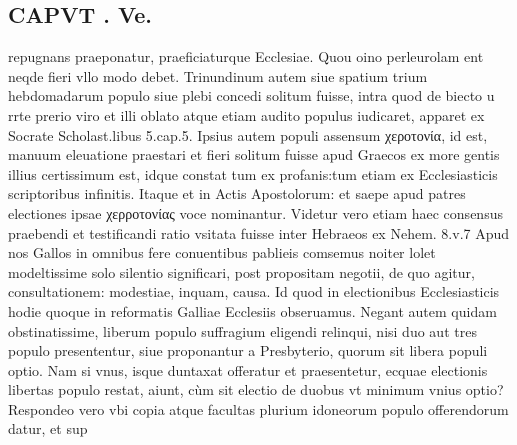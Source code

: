\documentclass{article}
\begin{document}
\begin{pages}
\section*{CAPVT . Ve. }
\marginpar{[ p.355 ]}\pstart repugnans praeponatur, praeficiaturque Ecclesiae. Quou oino perleurolam ent neqde fieri vllo modo debet.  \pend\pstart Trinundinum autem siue spatium trium hebdomadarum populo siue plebi concedi solitum fuisse, intra quod de biecto u rrte prerio viro et illi oblato atque etiam audito populus iudicaret, apparet ex Socrate Scholast.libus  5.cap.5.  \pend\pstart Ipsius autem populi assensum χεροτονία, id est, manuum eleuatione praestari et fieri solitum fuisse apud Graecos ex more gentis illius certissimum est, idque constat tum ex profanis:tum etiam ex Ecclesiasticis scriptoribus infinitis. Itaque  et in Actis Apostolorum: et saepe apud patres electiones ipsae χερροτονίας voce nominantur. Videtur vero etiam haec consensus praebendi et testificandi ratio vsitata fuisse inter Hebraeos ex Nehem. 8.v.7 Apud nos Gallos in omnibus fere conuentibus pablieis comsemus noiter lolet modeltissime solo silentio significari, post propositam negotii, de quo agitur, consultationem: modestiae, inquam, causa. Id quod in electionibus Ecclesiasticis hodie quoque in reformatis Galliae Ecclesiis obseruamus.  \pend\pstart Negant autem quidam obstinatissime, liberum populo suffragium eligendi relinqui, nisi duo aut tres populo presententur, siue proponantur a Presbyterio, quorum sit libera populi optio. Nam si vnus, isque duntaxat offeratur et praesentetur, ecquae electionis libertas populo restat, aiunt, cùm sit electio de duobus vt minimum vnius optio? Respondeo vero vbi copia atque facultas plurium idoneorum populo offerendorum datur, et sup\pend

\end{pages}
\end{document}
